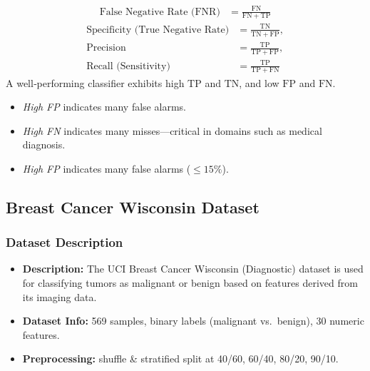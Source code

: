 \begin{flushleft}
\begin{itemize}
\begin{flushleft}
\begin{align*}
				      \text{False Negative Rate (FNR)} & = \frac{\mathrm{FN}}{\mathrm{FN} + \mathrm{TP}}
			      \end{align*}
			      \begin{align*}
				      \text{Specificity (True Negative Rate)} & = \frac{\mathrm{TN}}{\mathrm{TN} + \mathrm{FP}}, \\
				      \text{Precision}                        & = \frac{\mathrm{TP}}{\mathrm{TP} + \mathrm{FP}}, \\
				      \text{Recall (Sensitivity)}             & = \frac{\mathrm{TP}}{\mathrm{TP} + \mathrm{FN}}
			      \end{align*}
			      \noindent A well‐performing classifier exhibits high \(\mathrm{TP}\) and \(\mathrm{TN}\), and low \(\mathrm{FP}\) and \(\mathrm{FN}\).
			      \begin{itemize}
				      \item \emph{High FP} indicates many false alarms.
				      \item \emph{High FN} indicates many misses—critical in domains such as medical diagnosis.
				      \item \emph{High FP} indicates many false alarms (\(\leq 15\%\)).
			      \end{itemize}
		      \end{flushleft}
	\end{itemize}
\end{flushleft}

\clearpage
\subsection{Breast Cancer Wisconsin Dataset}
\subsubsection*{Dataset Description}
\begin{itemize}
	\item \textbf{Description:} The UCI Breast Cancer Wisconsin (Diagnostic) dataset is used for classifying tumors as malignant or benign based on features derived from its imaging data.
	\item \textbf{Dataset Info:} 569 samples, binary labels (malignant vs.\ benign), 30 numeric features.
	\item \textbf{Preprocessing:} shuffle \& stratified split at 40/60, 60/40, 80/20, 90/10.
\end{itemize}


